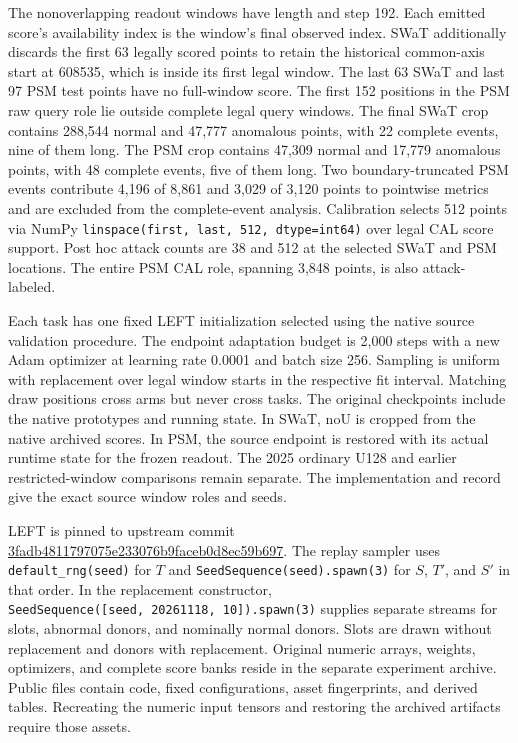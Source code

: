 \documentclass[11pt]{article}
\begin{document}
The nonoverlapping readout windows have length and step 192. Each
emitted score's availability index is the window's final observed index.
SWaT additionally discards the first 63 legally scored points to retain
the historical common-axis start at 608535, which is inside its first
legal window. The last 63 SWaT and last 97 PSM test points have no
full-window score. The first 152 positions in the PSM raw query role lie
outside complete legal query windows. The final SWaT crop contains
288,544 normal and 47,777 anomalous points, with 22 complete events,
nine of them long. The PSM crop contains 47,309 normal and 17,779
anomalous points, with 48 complete events, five of them long. Two
boundary-truncated PSM events contribute 4,196 of 8,861 and 3,029 of
3,120 points to pointwise metrics and are excluded from the
complete-event analysis. Calibration selects 512 points via NumPy
\texttt{linspace(first,\ last,\ 512,\ dtype=int64)} over legal CAL score
support. Post hoc attack counts are 38 and 512 at the selected SWaT and
PSM locations. The entire PSM CAL role, spanning 3,848 points, is also
attack-labeled.

Each task has one fixed LEFT initialization selected using the native
source validation procedure. The endpoint adaptation budget is 2,000
steps with a new Adam optimizer at learning rate 0.0001 and batch size
256. Sampling is uniform with replacement over legal window starts in
the respective fit interval. Matching draw positions cross arms but
never cross tasks. The original checkpoints include the native
prototypes and running state. In SWaT, noU is cropped from the native
archived scores. In PSM, the source endpoint is restored with its actual
runtime state for the frozen readout. The 2025 ordinary U128 and earlier
restricted-window comparisons remain separate. The implementation and
record give the exact source window roles and seeds.

LEFT is pinned to upstream commit
\href{https://github.com/DezhengWang/Left/tree/3fadb4811797075e233076b9faceb0d8ec59b697}{3fadb4811797075e233076b9faceb0d8ec59b697}.
The replay sampler uses \texttt{default\_rng(seed)} for \(T\) and
\texttt{SeedSequence(seed).spawn(3)} for \(S\), \(T'\), and \(S'\) in
that order. In the replacement constructor,
\texttt{SeedSequence({[}seed,\ 20261118,\ 10{]}).spawn(3)} supplies
separate streams for slots, abnormal donors, and nominally normal
donors. Slots are drawn without replacement and donors with replacement.
Original numeric arrays, weights, optimizers, and complete score banks
reside in the separate experiment archive. Public files contain code,
fixed configurations, asset fingerprints, and derived tables. Recreating
the numeric input tensors and restoring the archived artifacts require
those assets.
\end{document}
